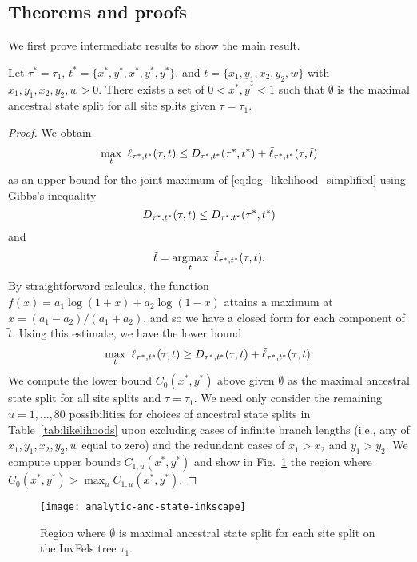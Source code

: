 \subsection*{Theorems and proofs}


We first prove intermediate results to show the main result.

\begin{lemma}
Let $\tau^*=\tau_1$, $t^*=\{x^*, y^*, x^*, y^*, y^*\}$, and $t=\{x_1, y_1, x_2, y_2, w\}$ with $x_1, y_1, x_2, y_2, w > 0$.
There exists a set of $0 < x^*, y^* < 1$ such that $\emptyset$ is the maximal ancestral state split for all site splits given $\tau=\tau_1$.
\end{lemma}

\begin{proof}
We obtain
\[
\max_{t} \ \ell_{\tau^*,t^*}(\tau, t) \le
    \shannonDivergence_{\tau^*,t^*}(\tau^*,t^*)
    + \tilde{\ell}_{\tau^*,t^*}(\tau, \tilde{t})
\]
as an upper bound for the joint maximum of \eqref{eq:log_likelihood_simplified} using Gibbs's inequality
\[
D_{\tau^*,t^*}(\tau,t) \le D_{\tau^*,t^*}(\tau^*,t^*)
\]
and
\[
\tilde{t} = \argmax_{t} \ \tilde{\ell}_{\tau^*,t^*}(\tau, t).
\]
By straightforward calculus, the function $f(x)=a_1\log(1+x)+a_2\log(1-x)$ attains a maximum at $\hat{x} = (a_1-a_2)/(a_1+a_2)$, and so we have a closed form for each component of $\tilde{t}$.
Using this estimate, we have the lower bound
\[
\max_{t} \ \ell_{\tau^*,t^*}(\tau, t) \ge
    D_{\tau^*,t^*}(\tau,\tilde{t})
    + \tilde{\ell}_{\tau^*,t^*}(\tau, \tilde{t}).
\]
We compute the lower bound $C_0(x^*,y^*)$ above given $\emptyset$ as the maximal ancestral state split for all site splits and $\tau=\tau_1$.
We need only consider the remaining $u=1,\ldots,80$ possibilities for choices of ancestral state splits in Table~\ref{tab:likelihoods} upon excluding cases of infinite branch lengths (i.e., any of $x_1,y_1,x_2,y_2,w$ equal to zero) and the redundant cases of $x_1 > x_2$ and $y_1 > y_2$.
We compute upper bounds $C_{1,u}(x^*,y^*)$ and show in Fig.~\ref{fig:max-anc-state} the region where $C_0(x^*,y^*) > \max_u C_{1,u}(x^*,y^*)$.
\end{proof}

\begin{figure}
\centering
\texttt{[image: analytic-anc-state-inkscape]}
\caption{
Region where $\emptyset$ is maximal ancestral state split for each site split on the InvFels tree $\tau_1$.
}
\label{fig:max-anc-state}
\end{figure}

